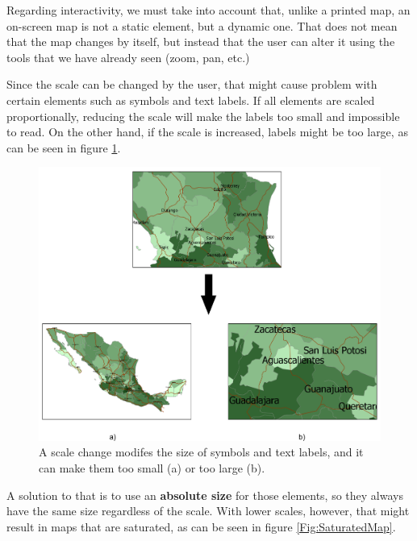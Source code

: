 Regarding interactivity, we must take into account that, unlike a printed map, an on-screen map is not a static element, but a dynamic one. That does not mean that the map changes by itself, but instead that the user can alter it using the tools that we have already seen (zoom, pan, etc.)

Since the scale can be changed by the user, that might cause problem with certain elements such as symbols and text labels. If all elements are scaled proportionally, reducing the scale will make the labels too small and impossible to read. On the other hand, if the scale is increased, labels might be too large, as can be seen in figure \ref{Fig:ProblemsChangeScale}. 


\begin{figure}[!hbt]
\centering
\includegraphics[width=\columnwidth]{Visualization/ProblemsChangeScale.pdf}
\caption{\small  A scale change modifes the size of symbols and text labels, and it can make them too small (a) or too large (b).}
\label{Fig:ProblemsChangeScale} 
\end{figure}

A solution to that is to use an \textbf{absolute size} for those elements, so they always have the same size regardless of the scale. With lower scales, however, that might result in maps that are saturated, as can be seen in figure \ref{Fig:SaturatedMap}.

